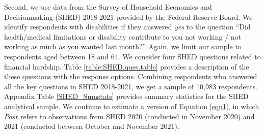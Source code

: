 \documentclass[12pt]{article}
\begin{document}
Second, we use data from the Survey of Household Economics and Decisionmaking (SHED) 2018-2021 provided by the Federal Reserve Board. We identify respondents with disabilities if they answered \emph{yes} to the question ``Did health/medical limitations or disability contribute to you not working / not working as much as you wanted last month?'' Again, we limit our sample to respondents aged between 18 and 64. We consider four SHED questions related to financial hardship. Table \ref{table:SHED.ques.table} provides a description of the these questions with the response options. Combining respondents who answered all the key questions in SHED 2018-2021, we get a sample of 10,983 respondents. Appendix Table \ref{SHED_Sumstats} provides summary statistics for the SHED analytical sample. We continue to estimate a version of Equation \ref{eqn1}, in which $Post$ refers to observations from SHED 2020 (conducted in November 2020) and 2021 (conducted between October and November 2021). 


\end{document}
